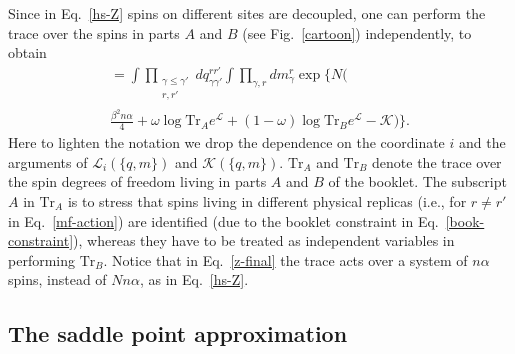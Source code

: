 \documentclass[twocolumn,superscriptaddress,prb,10pt]{revtex4-1}
\def\tr{\textrm{Tr}}
\begin{document}
Since in Eq.~\eqref{hs-Z} spins on  different sites are decoupled, one can 
perform the trace over the spins in parts $A$ and $B$ (see Fig.~\ref{cartoon}) 
independently, to obtain 
%
\begin{multline}
[Z^\alpha(\omega,n,\beta)]=
\int\prod_{\substack{\gamma\le\gamma'\\r,r'}}
dq^{rr'}_{\gamma\gamma'}
\int\prod_{\gamma,r}dm_\gamma^r
\exp\Big\{N\Big(\\
\frac{\beta^2n\alpha}{4}+\omega\log\tr_Ae^{{\mathcal L}}+
(1-\omega)\log\tr_Be^{{\mathcal L}}-{\mathcal K}\Big)\Big\}.
\label{z-final}
\end{multline}
%
Here to lighten the notation we drop the dependence on the coordinate $i$ 
and the arguments of ${\mathcal L}_i(\{q,m\})$ and ${\mathcal K}(\{q,m\})$. 
$\textrm{Tr}_{A}$ and $\textrm{Tr}_{B}$  denote the trace over the spin degrees 
of freedom living in parts $A$ and $B$ of the booklet.
The subscript $A$ in $\tr_A$ is to stress that spins living in different physical 
replicas (i.e., for $r\ne r'$ in Eq.~\eqref{mf-action}) are identified (due 
to the booklet constraint in Eq.~\eqref{book-constraint}), whereas they have 
to be treated as independent variables in performing $\tr_B$.  
Notice that in Eq.~\eqref{z-final} the trace acts over a system of $n\alpha$ 
spins, instead of $Nn\alpha$, as in Eq.~\eqref{hs-Z}. 

\subsection{The saddle point approximation}
\label{saddle-point}
\end{document}
